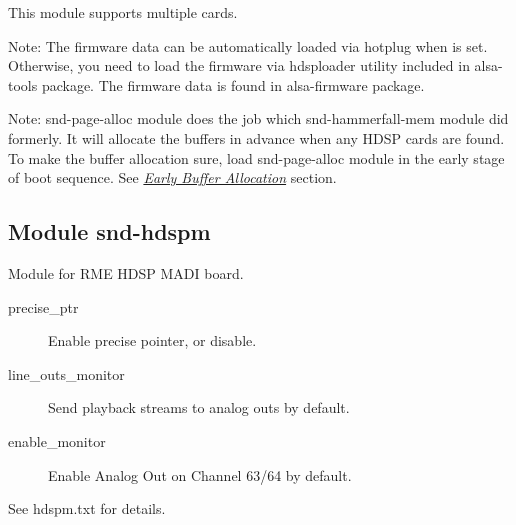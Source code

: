 \documentclass[a4paper,8pt,english]{sphinxmanual}
\begin{document}
This module supports multiple cards.

Note: The firmware data can be automatically loaded via hotplug
when  is set.  Otherwise, you need to load
the firmware via hdsploader utility included in alsa-tools
package.
The firmware data is found in alsa-firmware package.

Note: snd-page-alloc module does the job which snd-hammerfall-mem
module did formerly.  It will allocate the buffers in advance
when any HDSP cards are found.  To make the buffer
allocation sure, load snd-page-alloc module in the early
stage of boot sequence.  See {\hyperref[sound/alsa\string-configuration:early\string-buffer\string-allocation]{\emph{Early Buffer Allocation}}}
section.


\subsection{Module snd-hdspm}
\label{sound/alsa-configuration:module-snd-hdspm}
Module for RME HDSP MADI board.
\begin{description}
\item[{precise\_ptr}] \leavevmode
Enable precise pointer, or disable.

\item[{line\_outs\_monitor}] \leavevmode
Send playback streams to analog outs by default.

\item[{enable\_monitor}] \leavevmode
Enable Analog Out on Channel 63/64 by default.

\end{description}

See hdspm.txt for details.
\end{document}
